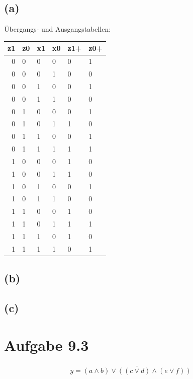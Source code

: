 \documentclass[12pt]{article}
\begin{document}
\subsection{(a)}
Übergangs- und Ausgangstabellen: \\
\begin{tabular} {rlll|ll}
z1 & z0 & x1 & x0 & z1+ & z0+ \\ \hline 
0 & 0 & 0 & 0 & 0 & 1\\
0 & 0 & 0 & 1 & 0 & 0\\
0 & 0 & 1 & 0 & 0 & 1\\
0 & 0 & 1 & 1 & 0 & 0\\
0 & 1 & 0 & 0 & 0 & 1\\
0 & 1 & 0 & 1 & 1 & 0\\
0 & 1 & 1 & 0 & 0 & 1\\
0 & 1 & 1 & 1 & 1 & 1\\
1 & 0 & 0 & 0 & 1 & 0\\
1 & 0 & 0 & 1 & 1 & 0\\
1 & 0 & 1 & 0 & 0 & 1\\
1 & 0 & 1 & 1 & 0 & 0\\
1 & 1 & 0 & 0 & 1 & 0\\
1 & 1 & 0 & 1 & 1 & 1\\
1 & 1 & 1 & 0 & 1 & 0\\
1 & 1 & 1 & 1 & 0 & 1
\end{tabular}
\subsection{(b)}
\subsection{(c)}

\section{Aufgabe 9.3}
\begin{align}
y = \overline{(a \land b) \lor ((c \lor d) \land (e \lor f))}
\end{align}
\end{document}
